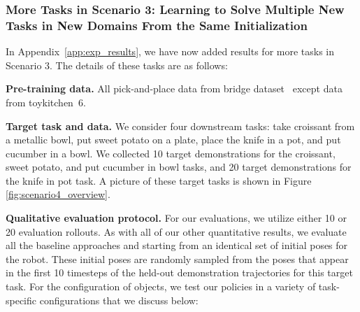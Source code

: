 \documentclass[conference]{IEEEtran}
\begin{document}
\subsubsection{More Tasks in Scenario 3: Learning to Solve Multiple New Tasks in New Domains From the Same Initialization}
\label{app:scenario4}

In Appendix~\ref{app:exp_results}, we have now added results for more tasks in Scenario 3. The details of these tasks are as follows:

\textbf{Pre-training data.} All pick-and-place data from bridge dataset~\citep{ebert2021bridge} except data from toykitchen~6.

\textbf{Target task and data.} We consider four downstream tasks: take croissant from a metallic bowl, put sweet potato on a plate, place the knife in a pot, and put cucumber in a bowl. We collected 10 target demonstrations for the croissant, sweet potato, and put cucumber in bowl tasks, and 20 target demonstrations for the knife in pot task. A picture of these target tasks is shown in Figure \ref{fig:scenario4_overview}.

\textbf{Qualitative evaluation protocol.} For our evaluations, we utilize either 10 or 20 evaluation rollouts. As with all of our other quantitative results, we evaluate all the baseline approaches and \methodname starting from an identical set of initial poses for the robot. These initial poses are randomly sampled from the poses that appear in the first 10 timesteps of the held-out demonstration trajectories for this target task. For the configuration of objects, we test our policies in a variety of task-specific configurations that we discuss below:
\end{document}
